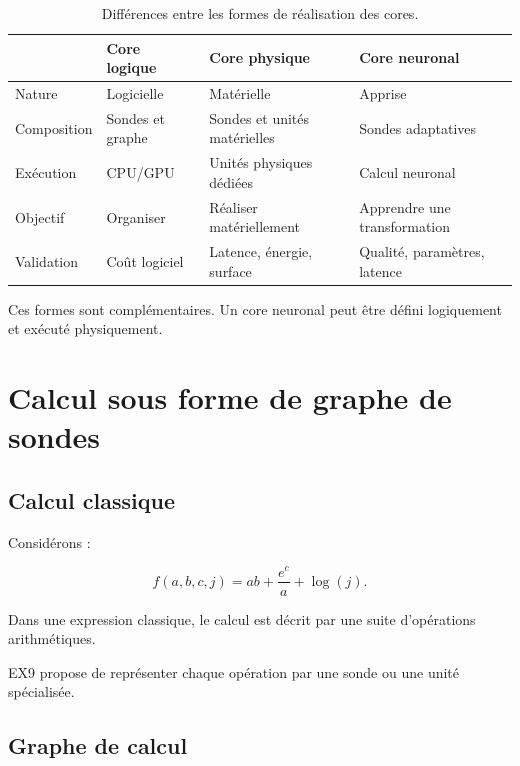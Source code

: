 \documentclass[11pt,a4paper]{article}
\begin{document}
\begin{table}[H]
\centering
\small
\begin{tabularx}{\textwidth}{p{2.5cm}XXX}
\toprule
 & Core logique & Core physique & Core neuronal \\
\midrule
Nature
& Logicielle
& Matérielle
& Apprise \\

Composition
& Sondes et graphe
& Sondes et unités matérielles
& Sondes adaptatives \\

Exécution
& CPU/GPU
& Unités physiques dédiées
& Calcul neuronal \\

Objectif
& Organiser
& Réaliser matériellement
& Apprendre une transformation \\

Validation
& Coût logiciel
& Latence, énergie, surface
& Qualité, paramètres, latence \\
\bottomrule
\end{tabularx}
\caption{Différences entre les formes de réalisation des cores.}
\end{table}

Ces formes sont complémentaires. Un core neuronal peut être défini
logiquement et exécuté physiquement.

\section{Calcul sous forme de graphe de sondes}

\subsection{Calcul classique}

Considérons :

\[
f(a,b,c,j)
=
ab+\frac{e^c}{a}+\log(j).
\]

Dans une expression classique, le calcul est décrit par une suite
d'opérations arithmétiques.

EX9 propose de représenter chaque opération par une sonde ou une
unité spécialisée.

\subsection{Graphe de calcul}
\end{document}
